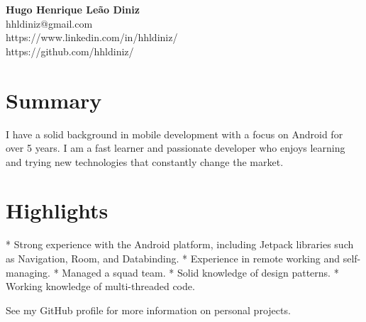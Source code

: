 \documentclass{article}  %
\begin{document}
\begin{center}
  \textbf{Hugo Henrique Leão Diniz} \\
  \small{hhldiniz@gmail.com} \\
  \small{https://www.linkedin.com/in/hhldiniz/} \\
  \small{https://github.com/hhldiniz/}
\end{center}

\section{Summary}

I have a solid background in mobile development with a focus on Android for over 5 years. 
I am a fast learner and passionate developer who enjoys learning and trying new technologies that constantly change the market.

\section{Highlights}

* Strong experience with the Android platform, including Jetpack libraries such as Navigation, Room, and Databinding.
* Experience in remote working and self-managing.
* Managed a squad team.
* Solid knowledge of design patterns.
* Working knowledge of multi-threaded code.





See my GitHub profile for more information on personal projects.
\end{document}
